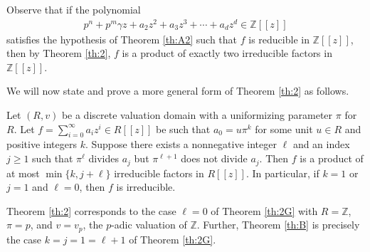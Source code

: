 \documentclass[12pt,reqno]{amsart}%
\begin{document}
Observe that if the polynomial
\begin{eqnarray*}
p^n+p^m \gamma z+a_2z^2+a_3z^3+\cdots+a_d z^d \in \mathbb{Z}[[z]]
\end{eqnarray*}
satisfies the hypothesis of Theorem \ref{th:A2} such that $f$
is reducible in $\mathbb{Z}[[z]]$, then by Theorem \ref{th:2},  $f$ is a product of exactly two irreducible factors in $\mathbb{Z}[[z]]$.

We will now state and prove a more general form of Theorem \ref{th:2} as follows.
\begin{theorem}\label{th:2G}
  Let $(R,v)$ be a discrete valuation domain with a uniformizing parameter $\pi$  for $R$. Let
  $f = \sum_{i=0}^\infty a_i z^i\in R[[z]]$ be such that $a_0= u \pi^k$ for some  unit $u\in R$ and positive integers $k$. Suppose there exists a nonnegative integer $\ell$  and an index $j\geq 1$ such that $\pi^{\ell}$ divides $a_{j}$ but  $\pi^{\ell+1}$ does not divide $a_{j}$. Then $f$ is a product of at most $\min\{k,j+\ell\}$ irreducible factors in $R[[z]]$. In particular, if $k=1$ or $j=1$ and $\ell=0$, then $f$ is irreducible.
\end{theorem}
Theorem \ref{th:2} corresponds to the case $\ell=0$  of Theorem \ref{th:2G} with $R=\mathbb{Z}$, $\pi=p$, and $v=v_p$, the $p$-adic valuation of $\mathbb{Z}$. Further, Theorem \ref{th:B} is precisely the case  $k=j=1=\ell+1$ of Theorem \ref{th:2G}.
\end{document}
